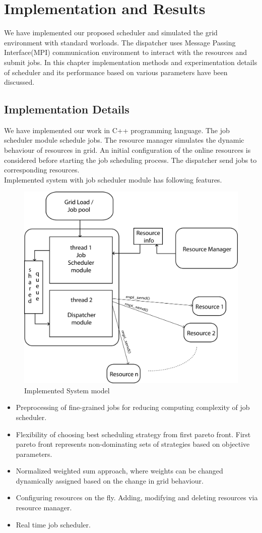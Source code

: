 \chapter{Implementation  and Results}
We have implemented our proposed scheduler and simulated the grid environment with standard worloads. The dispatcher uses Message Passing Interface(MPI) communication environment to interact with the resources and submit jobs. In this chapter implementation methods and experimentation details of scheduler and its performance based on various parameters have been discussed.
\section{Implementation Details}
We have implemented our work in C++ programming language. The job scheduler module schedule jobs. The resource manager simulates the dynamic behaviour of resources in grid. An initial configuration of the online resources is considered before starting the job scheduling process. The dispatcher send jobs to corresponding resources.\\
Implemented system with job scheduler module has following features.
\begin{figure}[t]
    \centering
    \includegraphics[width=1.0\columnwidth]{implement}
    \caption{Implemented System model}
	\label{fig:Systemmodel}
\end{figure}
\begin{itemize}
 \item Preprocessing of fine-grained jobs for reducing computing complexity of job scheduler.
 \item Flexibility of choosing best scheduling strategy from first pareto front. First pareto front represents non-dominating sets of strategies based on objective parameters.
 \item Normalized weighted sum approach, where weights can be changed dynamically assigned based on the change in grid behaviour.
 \item Configuring resources on the fly. Adding, modifying and deleting resources via resource manager.
 \item Real time job scheduler.
\end{itemize}
